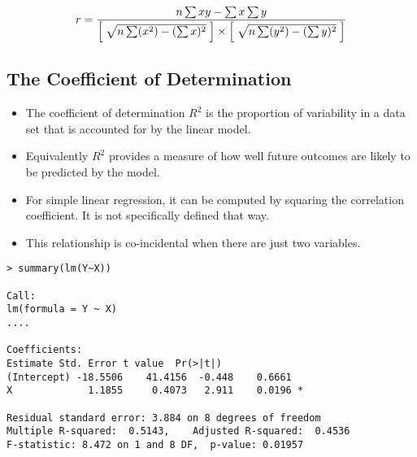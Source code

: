 \begin{framed}
\[
r = { \; n \sum xy - \sum x \sum y   \; \over \left[\;\sqrt{n \sum (x^2) - (\sum x)^2} \;\right] \times  \left[ \;\sqrt{n \sum (y^2) - (\sum y)^2}\; \right]}
\]
\end{framed}


\subsection*{The Coefficient of Determination}
\begin{itemize}
\item The coefficient of determination $R^2$ is the proportion of variability in a data set that is accounted for by the linear model. 
\item Equivalently $R^2$ provides a measure of how well future outcomes are likely to be predicted by the model.

\item For simple linear regression, it can be computed by squaring the correlation coefficient. It is not specifically defined that way. 
\item This relationship is co-incidental when there are just two variables.
\end{itemize}
\begin{framed}
\begin{verbatim}
> summary(lm(Y~X))

Call:
lm(formula = Y ~ X)
....

Coefficients:
Estimate Std. Error t value  Pr(>|t|)
(Intercept) -18.5506    41.4156  -0.448    0.6661
X             1.1855     0.4073   2.911    0.0196 *

Residual standard error: 3.884 on 8 degrees of freedom
Multiple R-squared:  0.5143,    Adjusted R-squared:  0.4536 
F-statistic: 8.472 on 1 and 8 DF,  p-value: 0.01957

\end{verbatim}
\end{framed}
